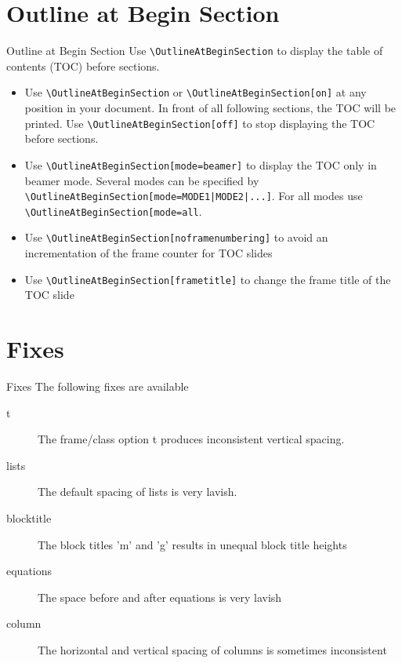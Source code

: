 \documentclass[8pt]{beamer}
\begin{document}
\section{Outline at Begin Section}
\begin{frame}{Outline at Begin Section}	
	Use \texttt{\textbackslash OutlineAtBeginSection} to display the table of contents (TOC) before sections.
	
	\begin{itemize}
		\item Use \texttt{\textbackslash OutlineAtBeginSection} or \texttt{\textbackslash OutlineAtBeginSection[on]} at any position in your document. In front of all following sections, the TOC will be printed. Use \texttt{\textbackslash OutlineAtBeginSection[off]} to stop displaying the TOC before sections.
		\item Use \texttt{\textbackslash OutlineAtBeginSection[mode=beamer]} to display the TOC only in beamer mode. Several modes can be specified by \texttt{\textbackslash OutlineAtBeginSection[mode={MODE1|MODE2|...}]}. For all modes use \texttt{\textbackslash OutlineAtBeginSection[mode=all}.
		\item Use \texttt{\textbackslash OutlineAtBeginSection[noframenumbering]} to avoid an incrementation of the frame counter for TOC slides
		\item Use \texttt{\textbackslash OutlineAtBeginSection[frametitle]} to change the frame title of the TOC slide
	\end{itemize}	
\end{frame}

\section{Fixes}
\begin{frame}{Fixes}	
	The following fixes are available		 
		\begin{description}
			\item[t] The frame/class option t produces inconsistent  vertical spacing.
			\item[lists] The default spacing of lists is very lavish.
			\item[blocktitle] The block titles 'm' and 'g' results in unequal block title heights
			\item[equations]  The space before and after equations is very lavish
			\item[column] The horizontal and vertical spacing of columns is sometimes inconsistent
		\end{description}
		
\end{frame}
\end{document}
